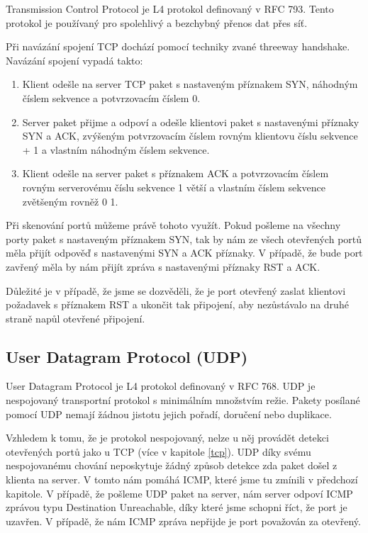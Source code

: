 \documentclass[../projekt.tex]{subfiles}
\begin{document}
Transmission Control Protocol je L4 protokol definovaný v RFC 793\cite{RFC0793}. Tento protokol je používaný pro spolehlivý a bezchybný přenos dat přes síť.

Při navázání spojení TCP dochází pomocí techniky zvané threeway handshake. Navázání spojení vypadá takto:
\begin{enumerate}
    \item Klient odešle na server TCP paket s nastaveným příznakem SYN, náhodným číslem sekvence a potvrzovacím číslem 0.
    \item Server paket přijme a odpoví a odešle klientovi paket s nastavenými příznaky SYN a ACK, zvýšeným potvrzovacím číslem rovným klientovu číslu sekvence + 1 a vlastním náhodným číslem sekvence.
    \item Klient odešle na server paket s příznakem ACK a potvrzovacím číslem rovným serverovému číslu sekvence 1 větší a vlastním číslem sekvence zvětšeným rovněž 0 1.
\end{enumerate} 

Při skenování portů můžeme právě tohoto využít. Pokud pošleme na všechny porty paket s nastaveným příznakem SYN, tak by nám ze všech otevřených portů měla přijít odpověď s nastavenými SYN a ACK příznaky. V případě, že bude port zavřený měla by nám přijít zpráva s nastavenými příznaky RST a ACK. 

Důležité je v případě, že jsme se dozvěděli, že je port otevřený zaslat klientovi požadavek s příznakem RST a ukončit tak připojení, aby nezůstávalo na druhé straně napůl otevřené připojení.

\subsection{User Datagram Protocol (UDP)} \label{udp}

User Datagram Protocol je L4 protokol definovaný v RFC 768\cite{RFC0768}. UDP je nespojovaný transportní protokol s minimálním množstvím režie. Pakety posílané pomocí UDP nemají žádnou jistotu jejich pořadí, doručení nebo duplikace. 

Vzhledem k tomu, že je protokol nespojovaný, nelze u něj provádět detekci otevřených portů jako u TCP (více v kapitole \ref{tcp}). UDP díky svému nespojovanému chování neposkytuje žádný způsob detekce zda paket došel z klienta na server. V tomto nám pomáhá ICMP, které jsme tu zmínili v předchozí kapitole. V případě, že pošleme UDP paket na server, nám server odpoví ICMP zprávou typu Destination Unreachable, díky které jsme schopni říct, že port je uzavřen. V případě, že nám ICMP zpráva nepřijde je port považován za otevřený.
\end{document}
